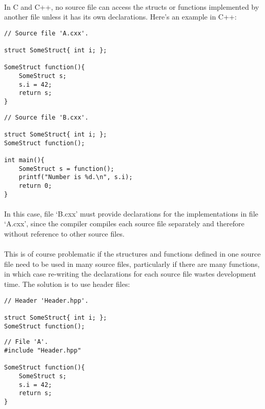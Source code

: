 \documentclass[12pt,twoside,notitlepage]{report}
\begin{document}
\paragraph{}
In C and C++, no source file can access the structs or functions implemented by another file unless it has its own declarations. Here's an example in C++:

\begin{lstlisting}
// Source file 'A.cxx'.

struct SomeStruct{ int i; };

SomeStruct function(){
	SomeStruct s;
	s.i = 42;
	return s;
}
\end{lstlisting}

\begin{lstlisting}
// Source file 'B.cxx'.

struct SomeStruct{ int i; };
SomeStruct function();

int main(){
	SomeStruct s = function();
	printf("Number is %d.\n", s.i);
	return 0;
}
\end{lstlisting}

\paragraph{}
In this case, file `B.cxx' must provide declarations for the implementations in file `A.cxx', since the compiler compiles each source file separately and therefore without reference to other source files.

\paragraph{}
This is of course problematic if the structures and functions defined in one source file need to be used in many source files, particularly if there are many functions, in which case re-writing the declarations for each source file wastes development time. The solution is to use header files:

\begin{lstlisting}
// Header 'Header.hpp'.

struct SomeStruct{ int i; };
SomeStruct function();
\end{lstlisting}

\begin{lstlisting}
// File 'A'.
#include "Header.hpp"

SomeStruct function(){
	SomeStruct s;
	s.i = 42;
	return s;
}
\end{lstlisting}
\end{document}

